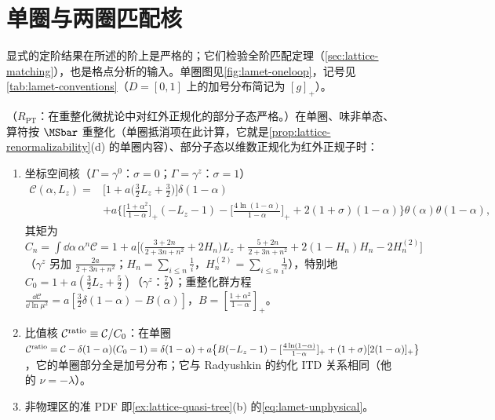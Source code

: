 \section{单圈与两圈匹配核}\label{sec:lamet-oneloop}

显式的定阶结果在所述的阶上是严格的；它们检验全阶匹配定理（\cref{sec:lattice-matching}），也是格点分析的输入。单圈图见\cref{fig:lamet-oneloop}，记号见\cref{tab:lamet-conventions}（$D=[0,1]$ 上的加号分布简记为 $[g]_+$）。


\begin{proposition}\label{prop:lamet-oneloop}
（$R_{\mathrm{PT}}$：在重整化微扰论中对红外正规化的部分子态严格。）在单圈、味非单态、算符按 $\MSbar$ 重整化（单圈抵消项在此计算，它就是\cref{prop:lattice-renormalizability}(d) 的单圈内容）、部分子态以维数正规化为红外正规子时：
\begin{enumerate}[label=(\alph*),leftmargin=2em,itemsep=2pt,topsep=2pt]
\item 坐标空间核（$\Gamma=\gamma^0$：$\sigma=0$；$\Gamma=\gamma^z$：$\sigma=1$）
\begin{equation}\label{eq:lamet-coord-kernel}
\begin{split}
\mathcal C(\alpha,L_z)={}&\Big[1+a\Big(\frac32L_z+\frac32\Big)\Big]\delta(1-\alpha)\\
&+a\Big\{\Big[\frac{1+\alpha^2}{1-\alpha}\Big]_+(-L_z-1)-\Big[\frac{4\ln(1-\alpha)}{1-\alpha}\Big]_++2(1+\sigma)(1-\alpha)\Big\}\theta(\alpha)\theta(1-\alpha),
\end{split}
\end{equation}%
其矩为 $C_n=\int\dd\alpha\,\alpha^n\mathcal C=1+a\big[\big(\frac{3+2n}{2+3n+n^2}+2H_n\big)L_z+\frac{5+2n}{2+3n+n^2}+2(1-H_n)H_n-2H^{(2)}_n\big]$（$\gamma^z$ 另加 $\frac{2a}{2+3n+n^2}$；$H_n=\sum_{i\le n}\frac1i$，$H^{(2)}_n=\sum_{i\le n}\frac1{i^2}$），特别地 $C_0=1+a(\frac32L_z+\frac52)$（$\gamma^z$：$\frac72$）；重整化群方程 $\frac{\dd\mathcal C}{\dd\ln\mu^2}=a[\frac32\delta(1-\alpha)-B(\alpha)]$，$B=[\frac{1+\alpha^2}{1-\alpha}]_+$。
\item 比值核 $\mathcal C^{\rm ratio}\equiv\mathcal C/C_0$：在单圈 $\mathcal C^{\rm ratio}=\mathcal C-\delta(1-\alpha)(C_0-1)=\delta(1-\alpha)+a\big\{B(-L_z-1)-[\frac{4\ln(1-\alpha)}{1-\alpha}]_++(1+\sigma)[2(1-\alpha)]_+\big\}$，它的单圈部分全是加号分布；它与 Radyushkin 的约化 ITD 关系相同（他的 $\nu=-\lambda$）。%
\item 非物理区的准 PDF 即\cref{ex:lattice-quasi-tree}(b) 的\cref{eq:lamet-unphysical}。

\end{enumerate}
\end{proposition}

